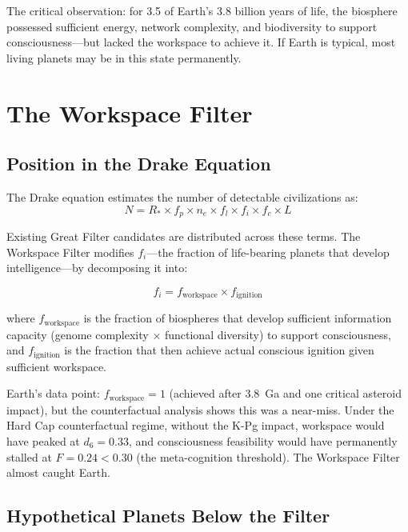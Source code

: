 \documentclass[10pt,letterpaper]{article}
\begin{document}
The critical observation: for 3.5 of Earth's 3.8 billion years of life,
the biosphere possessed sufficient energy, network complexity, and
biodiversity to support consciousness---but lacked the workspace to
achieve it. If Earth is typical, most living planets may be in this
state permanently.

\section*{The Workspace Filter}

\subsection*{Position in the Drake Equation}

The Drake equation estimates the number of detectable civilizations as:
\begin{equation}
N = R_* \times f_p \times n_e \times f_l \times f_i \times f_c \times L
\end{equation}

Existing Great Filter candidates \cite{hanson1998} are distributed across
these terms. The Workspace Filter modifies $f_i$---the fraction of
life-bearing planets that develop intelligence---by decomposing it into:

\begin{equation}
f_i = f_{\text{workspace}} \times f_{\text{ignition}}
\end{equation}

where $f_{\text{workspace}}$ is the fraction of biospheres that develop
sufficient information capacity (genome complexity $\times$ functional
diversity) to support consciousness, and $f_{\text{ignition}}$ is the
fraction that then achieve actual conscious ignition given sufficient
workspace.

Earth's data point: $f_{\text{workspace}} = 1$ (achieved after
3.8~Ga and one critical asteroid impact), but the counterfactual
analysis \cite{stoltz2026bt} shows this was a near-miss. Under the
Hard Cap counterfactual regime, without the K-Pg impact, workspace
would have peaked at $d_6 = 0.33$, and consciousness feasibility
would have permanently stalled at $F = 0.24 < 0.30$ (the meta-cognition
threshold). The Workspace Filter almost caught Earth.

\subsection*{Hypothetical Planets Below the Filter}
\end{document}
